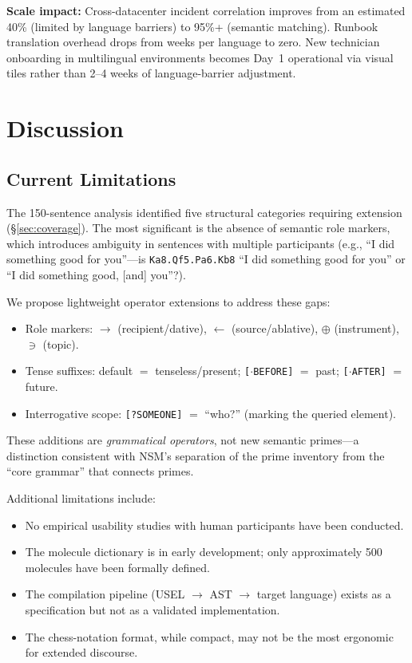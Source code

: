 \documentclass[11pt,a4paper]{article}
\begin{document}
\textbf{Scale impact:} Cross-datacenter incident correlation improves from an estimated 40\% (limited by language barriers) to 95\%+ (semantic matching). Runbook translation overhead drops from weeks per language to zero. New technician onboarding in multilingual environments becomes Day~1 operational via visual tiles rather than 2--4 weeks of language-barrier adjustment.

\section{Discussion}
\label{sec:discussion}

\subsection{Current Limitations}
\label{sec:limitations}

The 150-sentence analysis identified five structural categories requiring extension (\S\ref{sec:coverage}). The most significant is the absence of semantic role markers, which introduces ambiguity in sentences with multiple participants (e.g., ``I did something good for you''---is \texttt{Ka8.Qf5.Pa6.Kb8} ``I did something good for you'' or ``I did something good, [and] you''?).

We propose lightweight operator extensions to address these gaps:
\begin{itemize}[nosep]
    \item Role markers: \texttt{$\rightarrow$} (recipient/dative), \texttt{$\leftarrow$} (source/ablative), \texttt{$\oplus$} (instrument), \texttt{$\ni$} (topic).
    \item Tense suffixes: default $=$ tenseless/present; \texttt{[$\cdot$BEFORE]} $=$ past; \texttt{[$\cdot$AFTER]} $=$ future.
    \item Interrogative scope: \texttt{[?SOMEONE]} $=$ ``who?'' (marking the queried element).
\end{itemize}

These additions are \emph{grammatical operators}, not new semantic primes---a distinction consistent with NSM's separation of the prime inventory from the ``core grammar'' that connects primes.

Additional limitations include:
\begin{itemize}[nosep]
    \item No empirical usability studies with human participants have been conducted.
    \item The molecule dictionary is in early development; only approximately 500 molecules have been formally defined.
    \item The compilation pipeline (USEL $\rightarrow$ AST $\rightarrow$ target language) exists as a specification but not as a validated implementation.
    \item The chess-notation format, while compact, may not be the most ergonomic for extended discourse.
\end{itemize}
\end{document}
